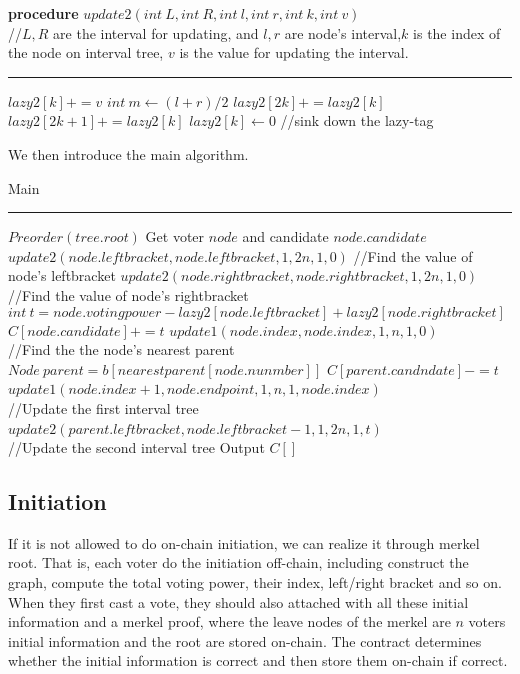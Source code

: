 \begin{algorithm}
	\textbf{procedure} $update2(int~L,int ~R, int~l, int~r, int~k, int~v)${\color{gray}
		\\//$L,R$ are the interval for updating, and $l,r$ are node's interval,$k$ is the index of the node on interval tree, $v$ is the value for updating the interval.}
	\hrule
	{
       $lazy2[k]+=v$
	}
	{
		$int~m \leftarrow (l+r)/2$\;
		$lazy2[2k] += lazy2[k]$\;
		$lazy2[2k+1]+= lazy2[k]$\;
		$lazy2[k] \leftarrow 0$
			{\color{gray}
		//sink down the lazy-tag}\;
    }
\end{algorithm}
We then introduce the main algorithm.
\begin{algorithm}
	\caption{Main}%
	\hrule
	$Preorder(tree.root)$\;
	{
		Get voter $node$ and candidate $node.candidate$\;
		$update2(node.leftbracket,node.leftbracket,1,2n,1,0)${\color{gray}
			//Find the value of node's leftbracket}\;
		$update2(node.rightbracket,node.rightbracket,1,2n,1,0)${\color{gray}
			//Find the value of node's rightbracket}\;
		$int~t=node.votingpower-lazy2[node.leftbracket]+lazy2[node.rightbracket]$\;
		$C[node.candidate]+=t$
		$update1(node.index,node.index,1,n,1,0)${\color{gray}
			\\//Find the the node's nearest parent}\;
		$Node~parent = b[nearestparent[node.nunmber]]$\;
		$C[parent.candndate]-=t$\;
		$update1(node.index+1,node.endpoint,1,n,1,node.index)${\color{gray}
			\\//Update the first interval tree}\;
		$update2(parent.leftbracket,node.leftbracket-1,1,2n,1,t)${\color{gray}
			\\//Update the second interval tree}\;
		Output $C[]$
	}
\end{algorithm}

\subsection{Initiation}
If it is not allowed to do on-chain initiation, we can realize it through merkel root. That is, each voter do the initiation off-chain, including construct the graph, compute the total voting power, their index, left/right bracket and so on. When they first cast a vote, they should also attached with all these initial  information and a merkel proof, where the leave nodes of the merkel are $n$ voters initial information and the root are stored on-chain. The contract determines whether the initial information is correct and then store them on-chain if correct.



